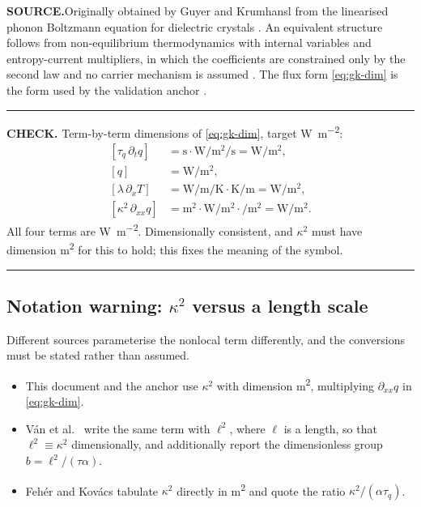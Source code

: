 \documentclass[11pt,a4paper]{article}
\theoremstyle{definition}
\newenvironment{checkbox}%
  {\par\medskip\noindent\begin{minipage}{\linewidth}%
   \rule{\linewidth}{0.4pt}\par\noindent\textbf{CHECK.}\enspace}%
  {\par\rule{\linewidth}{0.4pt}\end{minipage}\par\medskip}
\newcommand{\source}[1]{\par\smallskip\noindent\textbf{SOURCE.}\enspace #1\par}
\newcommand{\tq}{\tau_{q}}
\newcommand{\kk}{\kappa^{2}}
\begin{document}
\source{Originally obtained by Guyer and Krumhansl from the linearised phonon
Boltzmann equation for dielectric crystals
\cite{GuyerKrumhansl1966a,GuyerKrumhansl1966b}. An equivalent structure follows
from non-equilibrium thermodynamics with internal variables and entropy-current
multipliers, in which the coefficients are constrained only by the second law
and no carrier mechanism is assumed \cite{Van2001,Nyiri1991}. The flux form
\eqref{eq:gk-dim} is the form used by the validation anchor \cite{Kovacs2018}.}

\begin{checkbox}
Term-by-term dimensions of \eqref{eq:gk-dim}, target
\si{\watt\per\metre\squared}:
\begin{align*}
  \left[\tq\,\partial_{t}q\right]
    &= \si{\second}\cdot\si{\watt\per\metre\squared\per\second}
     = \si{\watt\per\metre\squared} ,\\
  \left[q\right] &= \si{\watt\per\metre\squared} ,\\
  \left[\lambda\,\partial_{x}T\right]
    &= \si{\watt\per\metre\per\kelvin}\cdot\si{\kelvin\per\metre}
     = \si{\watt\per\metre\squared} ,\\
  \left[\kk\,\partial_{xx}q\right]
    &= \si{\metre\squared}\cdot
       \si{\watt\per\metre\squared}\cdot\si{\per\metre\squared}
     = \si{\watt\per\metre\squared} .
\end{align*}
All four terms are \si{\watt\per\metre\squared}. Dimensionally consistent, and
$\kk$ must have dimension \si{\metre\squared} for this to hold; this fixes the
meaning of the symbol.
\end{checkbox}

\subsection{Notation warning: \texorpdfstring{$\kk$}{kappa2} versus a length scale}
\label{sec:notation-warning}

Different sources parameterise the nonlocal term differently, and the
conversions must be stated rather than assumed.

\begin{itemize}[nosep]
  \item This document and the anchor \cite{Kovacs2018} use $\kk$ with dimension
        \si{\metre\squared}, multiplying $\partial_{xx}q$ in \eqref{eq:gk-dim}.
  \item V\'an et al.\ \cite{Van2017} write the same term with $\ell^{2}$,
        where $\ell$ is a length, so that $\ell^{2}\equiv\kk$ dimensionally,
        and additionally report the dimensionless group
        $b=\ell^{2}/(\tau\alpha)$.
  \item Feh\'er and Kov\'acs \cite{FeherKovacs2021} tabulate $\kk$ directly in
        \si{\metre\squared} and quote the ratio $\kk/(\alpha\tq)$.
\end{itemize}
\end{document}
